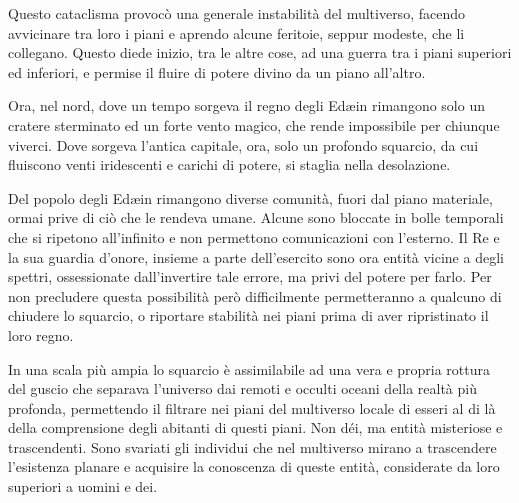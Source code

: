 Questo cataclisma provocò una generale instabilità del multiverso, facendo avvicinare tra loro i piani e aprendo alcune feritoie, seppur modeste, che li collegano.
Questo diede inizio, tra le altre cose, ad una guerra tra i piani superiori ed inferiori, e permise il fluire di potere divino da un piano all'altro.

Ora, nel nord, dove un tempo sorgeva il regno degli Edæin rimangono solo un cratere sterminato ed un forte vento magico, che rende impossibile per chiunque viverci. Dove sorgeva l'antica capitale, ora, solo un profondo squarcio, da cui fluiscono venti iridescenti e carichi di potere, si staglia nella desolazione.

Del popolo degli Edæin rimangono diverse comunità, fuori dal piano materiale, ormai prive di ciò che le rendeva umane. Alcune sono bloccate in bolle temporali che si ripetono all'infinito e non permettono comunicazioni con l'esterno.
Il Re e la sua guardia d'onore, insieme a parte dell'esercito sono ora entità vicine a degli spettri, ossessionate dall'invertire tale errore, ma privi del potere per farlo.
Per non precludere questa possibilità però difficilmente permetteranno a qualcuno di chiudere lo squarcio, o riportare stabilità nei piani prima di aver ripristinato il loro regno.

In una scala più ampia lo squarcio è assimilabile ad una vera e propria rottura del guscio che separava l'universo dai remoti e occulti oceani della realtà più profonda, permettendo il filtrare nei piani del multiverso locale di esseri al di là della comprensione degli abitanti di questi piani.
Non déi, ma entità misteriose e trascendenti. Sono svariati gli individui che nel multiverso mirano a trascendere l'esistenza planare e acquisire la conoscenza di queste entità, considerate da loro superiori a uomini e dei.

\clearpage
